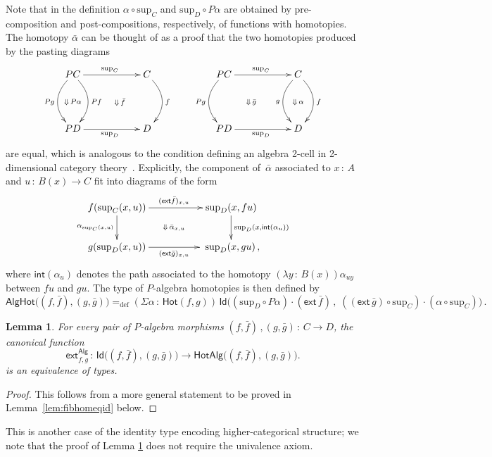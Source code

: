 \documentclass[10pt,a4paper,oneside,reqno]{amsart}
\numberwithin{equation}{section}
\theoremstyle{mythm}
\newtheorem{lemma}[theorem]{Lemma}
\theoremstyle{mydef}
\theoremstyle{myrmk}
\newcommand{\defeq}{=_{\mathrm{def}}}
\newcommand{\co}{\,{:}\,}
\newcommand{\ct}{\cdot}
\newcommand{\Hot}{\mathsf{Hot}}
\newcommand{\ext}{\mathsf{ext}}
\renewcommand{\int}{\mathsf{int}}
\newcommand{\Id}{\mathsf{Id}}
\newcommand{\Palg}{\mathsf{Alg}}
\renewcommand{\sup}{\mathrm{sup}}
\newcommand{\AlgHot}{\mathsf{AlgHot}}
\begin{document}
Note that in the definition $\alpha \circ \sup_C$ and $\sup_D \circ P \alpha$ are obtained by pre-composition and post-compositions, respectively, of functions with homotopies. The homotopy $\bar{\alpha}$ can be thought of as a proof that the two homotopies produced by the pasting diagrams
\[
\xymatrix@C=2cm@R=1.5cm{
PC \ar[r]^{\sup_C} \ar@/_1.3pc/[d]_{Pg}  \ar@/^1.3pc/[d]^{Pf}  \ar@{}[dr]|{\qquad \Downarrow \, \bar{f}}
\ar@{}[d]|{\Downarrow \, P\alpha}
  & C \ar@/^1.3pc/[d]^{f} \\ 
PD \ar[r]_{\sup_D} & D} \qquad
\xymatrix@C=2cm@R=1.5cm{
PC \ar[r]^{\sup_C} \ar@/_1.3pc/[d]_{Pg}  \ar@{}[dr]|{\Downarrow \, \bar{g} \qquad} & C \ar@/^1.3pc/[d]^{f} \ar@/_1.3pc/[d]_{g} \ar@{}[d]|{\Downarrow \, \alpha} \\ 
PD \ar[r]_{\sup_D} & D} 
\]
are equal, which is analogous to the condition defining an algebra 2-cell in 2-dimensional category 
theory~\cite{BlackwellR:twodmt}.   Explicitly, the
component of~$\bar{\alpha}$ associated to $x \co A$ and $u \co B(x) \to C$ fit into diagrams of the form
\[
\xymatrix@C=1.8cm{
f (\sup_C(x,u)) 
\ar[r]^{(\ext \bar{f})_{x,u}}
\ar[d]_{\alpha_{\sup_C(x,u)}} 
\ar@{}[dr]|{\Downarrow \, \bar{\alpha}_{x,u}}  & 
 \sup_D(x, fu) \ar[d]^{\sup_D(x, \int( \alpha_u))} \\
g (\sup_D(x,u)) \ar[r]_{(\ext \bar{g})_{x,u}} &\;  \sup_D(x, gu) \, ,}
\]
where $\int(\alpha_u)$ denotes the path associated to the homotopy 
$(\lambda y \co B(x)) \alpha_{uy}$ between $fu$ and $gu$.
The type of $P$-algebra homotopies is then defined by
\[
\AlgHot \big( (f,\bar{f}), (g, \bar{g})  \big)
 \defeq  
(\Sigma \alpha \co \Hot(  f , g)) \, \Id\big( 
( \sup_D \circ P \alpha ) \ct  (\ext \, \bar{f}) \, , \;  ( (\ext \, \bar{g}) \circ \sup_C) \cdot (\alpha \circ \sup_C)
 \big) \, .
\]


\newcommand{\HotAlg}{\mathsf{HotAlg}}


\begin{lemma}\label{IdEqHo}
For every pair of $P$-algebra morphisms $(f, \bar{f}) \, , (g, \bar{g}) \co C \to D$,  
the canonical function
\[
\ext^{\Palg}_{f,g}  \co 
\Id\big((f, \bar{f}), (g, \bar{g})\big) \to \HotAlg \big((f, \bar{f}), (g, \bar{g})\big).
\]
 is an equivalence of types. 
\end{lemma}

\begin{proof}
This follows from a more general statement to be proved in Lemma~\ref{lem:fibhomeqid} below.
\end{proof}
This is another case of the identity type encoding higher-categorical structure; we note that the proof of Lemma \ref{IdEqHo}
does not require the univalence axiom.
\end{document}
